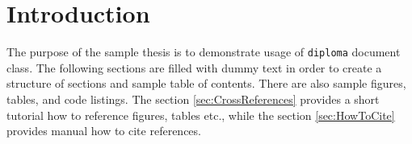 \chapter{Introduction}
\label{sec:Introduction}
The purpose of the sample thesis is to demonstrate usage of \verb|diploma| document class. The following sections are filled with dummy text in order to create a structure of sections and sample table of contents. There are also sample figures, tables, and code listings. The section \ref{sec:CrossReferences} provides a short tutorial how to reference figures, tables etc., while the section \ref{sec:HowToCite} provides manual how to cite references.
\endinput